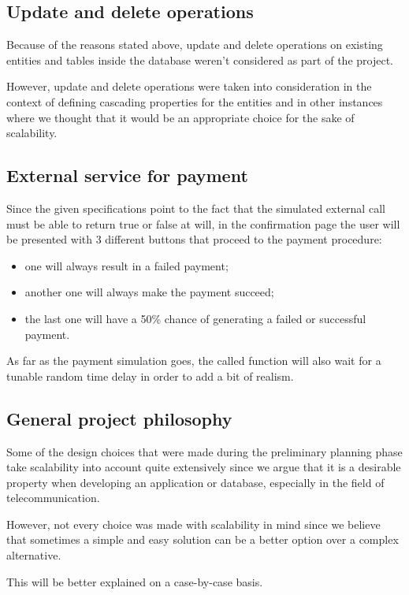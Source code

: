 \subsection*{Update and delete operations}

Because of the reasons stated above, update and delete operations on existing entities and tables inside the database weren't considered as part of the project.

However, update and delete operations were taken into consideration in the context of defining cascading properties for the entities and in other instances where we thought that it would be an appropriate choice for the sake of scalability.

\subsection*{External service for payment}

Since the given specifications point to the fact that the simulated external call must be able to return true or false at will, in the confirmation page the user will be presented with 3 different buttons that proceed to the payment procedure:
\begin{itemize}
    \item one will always result in a failed payment;
    \item another one will always make the payment succeed;
    \item the last one will have a 50\% chance of generating a failed or successful payment.
\end{itemize}

As far as the payment simulation goes, the called function will also wait for a tunable random time delay in order to add a bit of realism.

\subsection*{General project philosophy}

Some of the design choices that were made during the preliminary planning phase take scalability into account quite extensively since we argue that it is a desirable property when developing an application or database, especially in the field of telecommunication.

However, not every choice was made with scalability in mind since we believe that sometimes a simple and easy solution can be a better option over a complex alternative.

This will be better explained on a case-by-case basis.
